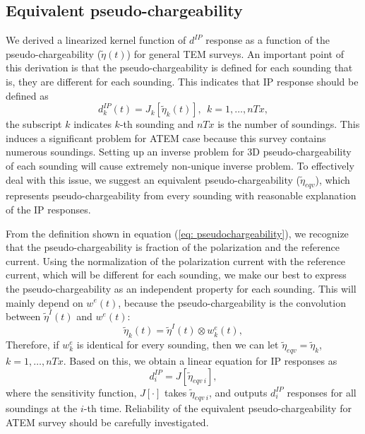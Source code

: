 \documentclass[a4paper, 11pt]{article}
\newcommand{\peta}{\tilde{\eta}}
\newcommand{\dip}{d^{IP}}
\begin{document}
\subsection{Equivalent pseudo-chargeability}
We derived a linearized kernel function of $\dip$ response as a function of the pseudo-chargeability ($\peta(t)$) for general TEM surveys. 
An important point of this derivation is that the pseudo-chargeability is defined for each sounding that is, they are different for each sounding. 
This indicates that IP response should be defined as 
\begin{equation}
  \dip_k(t) = J_k[\peta_k (t)], \ \ k=1, \ldots, nTx,
\end{equation}
the subscript $k$ indicates $k$-th sounding and $nTx$ is the number of soundings. This  induces a significant problem for ATEM case because this survey contains numerous soundings.
Setting up an inverse problem for 3D pseudo-chargeability of each sounding will cause extremely non-unique inverse problem. 
To effectively deal with this issue, we suggest an equivalent pseudo-chargeability ($\peta_{eqv}$), which represents pseudo-chargeability from every sounding with reasonable explanation of the IP responses. 

From the definition shown in equation (\ref{eq: pseudochargeability}), we recognize that the pseudo-chargeability is fraction of the polarization and the reference current. 
Using the normalization of the polarization current with the reference current, which will be different for each sounding, we make our best to express the pseudo-chargeability as an independent property for each sounding. 
This will mainly depend on $w^e(t)$, because the pseudo-chargeability is the convolution between $\peta^{I}(t)$ and $w^e(t)$:
\begin{equation}
  \peta_k(t) = \peta^{I}(t) \otimes w^e_k(t),
  \label{eq: pseudochargeability_petaI}
\end{equation}
Therefore, if $w^e_k$ is identical for every sounding, then we can let $\peta_{eqv} = \peta_k$, $k=1, \ldots, nTx$. 
Based on this, we obtain a linear equation for IP responses as
\begin{equation}
  \dip_i =J[\peta_{eqv \ i}],
  \label{eq: pseudochargeability_equivalent}
\end{equation}
where the sensitivity function, $J[\cdot]$ takes $\peta_{eqv \ i}$, and outputs $\dip_i$ responses for all soundings at the $i$-th time. 
Reliability of the equivalent pseudo-chargeability for ATEM survey should be carefully investigated. 
\end{document}
